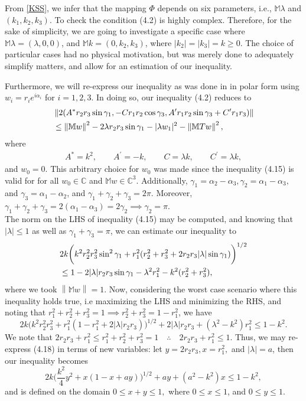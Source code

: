 \documentclass[11pt,reqno]{amsart}
\theoremstyle{definition}
\numberwithin{equation}{section} \setcounter{tocdepth}{1}
\def\bm{{\mathbb M}}
\newcommand{\norm}[1]{\left \lVert #1 \right \rVert}
\numberwithin{equation}{section}
\begin{document}
From \eqref{KSS}, we infer that the mapping $\Phi$ depends on six parameters, i.e., $\bm{\lambda}$ and $(k_1,k_2,k_3)$. To check the condition
(4.2) is highly complex. Therefore, for the sake of simplicity, we are going to investigate a specific case where $\bm{\lambda}=(\lambda,0,0)$, and $\bm{k}=(0,k_2,k_3)$, where $|k_2|=|k_3|=k\geq 0$. The choice of particular cases had no physical motivation, but was merely done to adequately simplify  matters, and allow for an estimation of our inequality.

Furthermore, we will re-express our inequality as was done in \cite{KS} in polar form using $w_i=r_ie^{i\alpha_i}$ for  $i=1,2,3.$ In doing so, our inequality (4.2) reduces to
\begin{align}
    &\norm{2(A^*r_2r_3\sin \gamma_1, -Cr_1r_2 \cos \gamma_3, A^{\prime}r_1r_2 \sin \gamma_3+C^{\prime}r_1r_3 )} \notag \\
    &\leq \norm{\bm{w}}^2-2\lambda r_2r_3 \sin \gamma_1- |\lambda w_1|^2-\norm{\bm{Tw}}^2,
\end{align}where \begin{align}
    A^*=k^2, \qquad  A^{\prime}=-k, \qquad C=\lambda k,\qquad C^{\prime}=\lambda k,
\end{align}
and $w_0=0$. This arbitrary choice for $w_0$ was made since the inequality (4.15) is valid for for all $w_0 \in \mathbb{C}$ and $\bm{w}\in \mathbb{C}^3$. Additionally, $\gamma_1=\alpha_2-\alpha_3, \gamma_2=\alpha_1-\alpha_3,$ and $\gamma_3=\alpha_1-\alpha_2$, and $\gamma_1+\gamma_2+\gamma_3=2\pi.$ Moreover, $\gamma_1+\gamma_2+\gamma_3=2(\alpha_1-\alpha_3)=2\gamma_2 \implies\gamma_2=\pi.$\\

The norm on the LHS of inequality (4.15) may be computed, and knowing that $|\lambda|\leq 1$ as well as $\gamma_1+\gamma_3=\pi$, we can estimate our inequality to
\begin{align}
    &2k\bigg(k^2r_2^2r_3^2 \sin^2 \gamma_1 +r_1^2(r_2^2+r_3^2+2r_2r_3|\lambda| \sin \gamma_1)\bigg)^{1/2} \notag \\
    &\leq 1-2|\lambda|r_2r_3 \sin \gamma_1 -\lambda^2 r_1^2-k^2(r_2^2+r_3^2),
\end{align}where we took $\norm{\bm{w}}=1.$ Now, considering the worst case scenario where this inequality holds true, i.e maximizing the LHS and minimizing the RHS, and noting that
 $r_1^2+r_2^2+r_3^2=1 \implies r_2^2+r_3^2=1-r_1^2$, we have
\begin{equation}
    2k\bigg(k^2r_2^2r_3^2+r_1^2(1-r_1^2+2|\lambda|r_2r_3)\bigg)^{1/2}+2|\lambda|r_2r_3+(\lambda^2-k^2)r_1^2 \leq 1-k^2.
\end{equation}We note that $2r_2r_3+r_1^2 \leq r_1^2+r_2^2+r_3^2=1 \quad \therefore \quad 2r_2r_3+r_1^2 \leq 1$. Thus, we may re-express (4.18) in terms of new variables: let $y=2r_2r_3,  x=r_1^2,$ and $|\lambda|=a$, then our inequality becomes
\begin{equation}
    2k\bigg(\frac{k^2}{4}y^2+x(1-x+ay)\bigg)^{1/2}+ay+(a^2-k^2)x\leq 1-k^2,
\end{equation}and is defined on the domain $0 \leq x+y \leq 1,$ where $0\leq x \leq 1$, and $0 \leq y \leq 1.$\\
\end{document}

